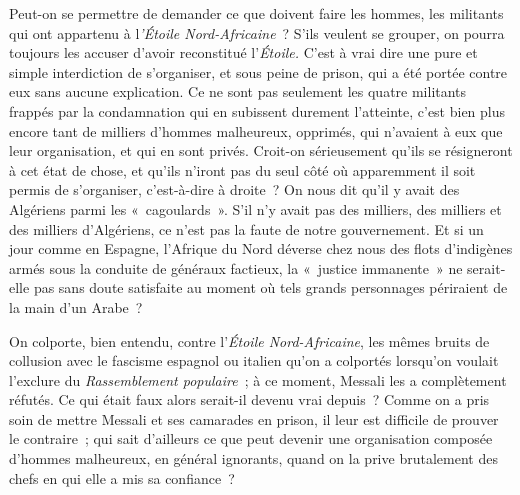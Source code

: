 \documentclass[french,twoside]{book} %
\begin{document}
Peut-on se permettre de demander ce que doivent faire les hommes, les militants qui ont appartenu à l{\itshape 'Étoile Nord-Africaine} ? S'ils veulent se grouper, on pourra toujours les accuser d'avoir reconstitué l'{\itshape Étoile.} C'est à vrai dire une pure et simple interdiction de s'organiser, et sous peine de prison, qui a été portée contre eux sans aucune explication. Ce ne sont pas seulement les quatre militants frappés par la condamnation qui en subissent durement l'atteinte, c'est bien plus encore tant de milliers d'hommes malheureux, opprimés, qui n'avaient à eux que leur organisation, et qui en sont privés. Croit-on sérieu­sement qu'ils se résigneront à cet état de chose, et qu'ils n'iront pas du seul côté où apparemment il soit permis de s'organiser, c'est-à-dire à droite ? On nous dit qu'il y avait des Algériens parmi les « cagoulards ». S'il n'y avait pas des milliers, des milliers et des milliers d'Algériens, ce n'est pas la faute de notre gouvernement. Et si un jour comme en Espagne, l'Afrique du Nord déverse chez nous des flots d'indigènes armés sous la conduite de généraux factieux, la « justice immanente » ne serait-elle pas sans doute satisfaite au moment où tels grands personnages périraient de la main d'un Arabe ?\par
On colporte, bien entendu, contre l'{\itshape Étoile Nord-Africaine}, les mêmes bruits de collusion avec le fascisme espagnol ou italien qu'on a colportés lors­qu'on voulait l'exclure du {\itshape Rassemblement populaire} ; à ce moment, Messali les a complètement réfutés. Ce qui était faux alors serait-il devenu vrai depuis ? Comme on a pris soin de mettre Messali et ses camarades en prison, il leur est difficile de prouver le contraire ; qui sait d'ailleurs ce que peut devenir une organisation composée d'hommes malheureux, en général igno­rants, quand on la prive brutalement des chefs en qui elle a mis sa confiance ?\par
\end{document}
